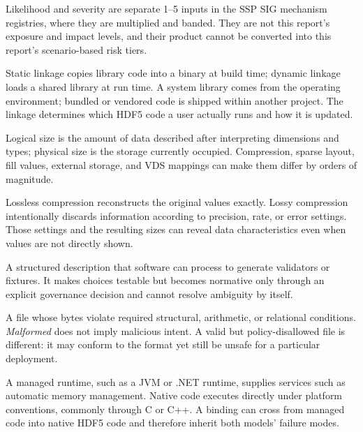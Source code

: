 \documentclass[../main.tex]{subfiles}
\begin{document}
\begin{description}[leftmargin=1.5em,style=nextline]
\item[Likelihood / severity in SSP SIG registries.]
Likelihood and severity are separate 1--5 inputs in the SSP SIG mechanism
registries, where they are multiplied and banded. They are not this report's
exposure and impact levels, and their product cannot be converted into this
report's scenario-based risk tiers.

\item[Linkage: static, dynamic, system, bundled, or vendored.]
Static linkage copies library code into a binary at build time; dynamic linkage
loads a shared library at run time. A system library comes from the operating
environment; bundled or vendored code is shipped within another project. The
linkage determines which HDF5 code a user actually runs and how it is updated.

\item[Logical size / physical size.]
Logical size is the amount of data described after interpreting dimensions and
types; physical size is the storage currently occupied. Compression, sparse
layout, fill values, external storage, and VDS mappings can make them differ by
orders of magnitude.

\item[Lossless / lossy compression.]
Lossless compression reconstructs the original values exactly. Lossy
compression intentionally discards information according to precision, rate,
or error settings. Those settings and the resulting sizes can reveal data
characteristics even when values are not directly shown.

\item[Machine-readable specification.]
A structured description that software can process to generate validators or
fixtures. It makes choices testable but becomes normative only through an
explicit governance decision and cannot resolve ambiguity by itself.

\item[Malformed / invalid / inconsistent file.]
A file whose bytes violate required structural, arithmetic, or relational
conditions. \emph{Malformed} does not imply malicious intent. A valid but
policy-disallowed file is different: it may conform to the format yet still be
unsafe for a particular deployment.

\item[Managed runtime / native code.]
A managed runtime, such as a JVM or .NET runtime, supplies services such as
automatic memory management. Native code executes directly under platform
conventions, commonly through C or C++. A binding can cross from managed code
into native HDF5 code and therefore inherit both models' failure modes.


\end{description}
\end{document}

